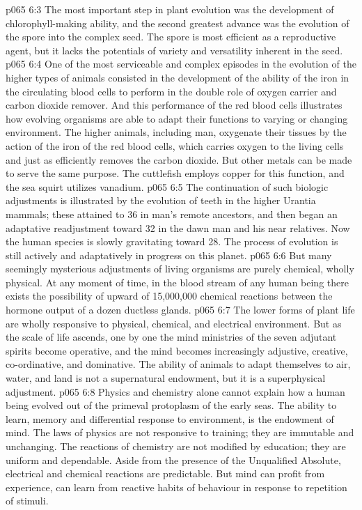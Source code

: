 \vs p065 6:3 The most important step in plant evolution was the development of chlorophyll\hyp{}making ability, and the second greatest advance was the evolution of the spore into the complex seed. The spore is most efficient as a reproductive agent, but it lacks the potentials of variety and versatility inherent in the seed.
\vs p065 6:4 One of the most serviceable and complex episodes in the evolution of the higher types of animals consisted in the development of the ability of the iron in the circulating blood cells to perform in the double role of oxygen carrier and carbon dioxide remover. And this performance of the red blood cells illustrates how evolving organisms are able to adapt their functions to varying or changing environment. The higher animals, including man, oxygenate their tissues by the action of the iron of the red blood cells, which carries oxygen to the living cells and just as efficiently removes the carbon dioxide. But other metals can be made to serve the same purpose. The cuttlefish employs copper for this function, and the sea squirt utilizes vanadium.
\vs p065 6:5 The continuation of such biologic adjustments is illustrated by the evolution of teeth in the higher Urantia mammals; these attained to 36 in man’s remote ancestors, and then began an adaptative readjustment toward 32 in the dawn man and his near relatives. Now the human species is slowly gravitating toward 28. The process of evolution is still actively and adaptatively in progress on this planet.
\vs p065 6:6 But many seemingly mysterious adjustments of living organisms are purely chemical, wholly physical. At any moment of time, in the blood stream of any human being there exists the possibility of upward of 15,000,000 chemical reactions between the hormone output of a dozen ductless glands.
\vs p065 6:7 \pc The lower forms of plant life are wholly responsive to physical, chemical, and electrical environment. But as the scale of life ascends, one by one the mind ministries of the seven adjutant spirits become operative, and the mind becomes increasingly adjustive, creative, co\hyp{}ordinative, and dominative. The ability of animals to adapt themselves to air, water, and land is not a supernatural endowment, but it is a superphysical adjustment.
\vs p065 6:8 Physics and chemistry alone cannot explain how a human being evolved out of the primeval protoplasm of the early seas. The ability to learn, memory and differential response to environment, is the endowment of mind. The laws of physics are not responsive to training; they are immutable and unchanging. The reactions of chemistry are not modified by education; they are uniform and dependable. Aside from the presence of the Unqualified Absolute, electrical and chemical reactions are predictable. But mind can profit from experience, can learn from reactive habits of behaviour in response to repetition of stimuli.
